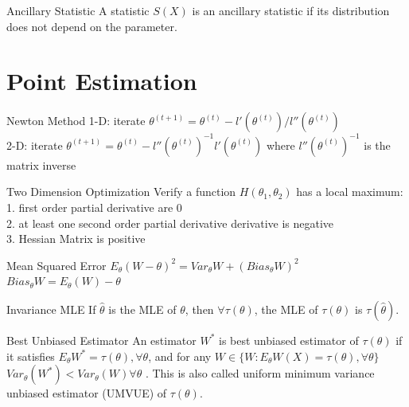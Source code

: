 \documentclass{article}
\begin{document}
\begin{multicols*}{3}
\begin{thmbox}{Ancillary Statistic}
A statistic $S(X)$ is an ancillary statistic if its distribution does not depend on the parameter.
\end{thmbox}


\section{Point Estimation}

\begin{thmbox}{Newton Method}
    1-D: iterate $\theta^{(t + 1)} = \theta^{(t)} - l'(\theta^{(t)}) / l''(\theta^{(t)})$\\
    2-D: iterate $\theta^{(t + 1)} = \theta^{(t)} - l''(\theta^{(t)})^{-1}l'(\theta^{(t)}) $ where $l''(\theta^{(t)})^{-1}$ is the matrix inverse
\end{thmbox}
\begin{thmbox}{Two Dimension Optimization}
    Verify a function $H(\theta_1, \theta_2)$ has a local maximum: \\
    1. first order partial derivative are 0\\
    2. at least one second order partial derivative derivative is negative \\
    3. Hessian Matrix is positive\\
    
\end{thmbox}
\begin{thmbox}{Mean Squared Error}
$E_{\theta}(W-\theta)^2 = Var_{\theta}W +(Bias_{\theta}W)^2$\\
$Bias_{\theta}W = E_{\theta}(W) - \theta$
\end{thmbox}

\begin{thmbox}{Invariance MLE}
If $\hat\theta$ is the MLE of $\theta$, then $\forall \tau(\theta)$, the MLE of $\tau(\theta)$ is $\tau(\hat\theta)$.
\end{thmbox}

\begin{thmbox}{Best Unbiased Estimator}
An estimator $W^*$ is best unbiased estimator of $\tau(\theta)$ if it satisfies $E_\theta W^* = \tau(\theta),\forall\theta$, and for any $W\in \{W:E_\theta W(X) = \tau(\theta), \forall \theta\}$ $Var_\theta(W^*) < Var_\theta(W)\forall \theta$ . This is also called uniform minimum variance unbiased estimator (UMVUE) of $\tau(\theta)$.

\end{thmbox}


\end{multicols*}
\end{document}
